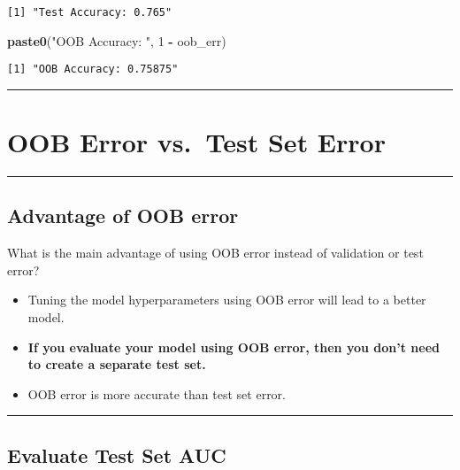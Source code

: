 \documentclass[
]{book}
\newenvironment{Shaded}{\begin{snugshade}}{\end{snugshade}}
\newcommand{\DecValTok}[1]{\textcolor[rgb]{0.00,0.00,0.81}{#1}}
\newcommand{\KeywordTok}[1]{\textcolor[rgb]{0.13,0.29,0.53}{\textbf{#1}}}
\newcommand{\NormalTok}[1]{#1}
\newcommand{\OperatorTok}[1]{\textcolor[rgb]{0.81,0.36,0.00}{\textbf{#1}}}
\newcommand{\StringTok}[1]{\textcolor[rgb]{0.31,0.60,0.02}{#1}}
\begin{document}
\begin{verbatim}
[1] "Test Accuracy: 0.765"
\end{verbatim}

\begin{Shaded}
\begin{Highlighting}[]
\KeywordTok{paste0}\NormalTok{(}\StringTok{"OOB Accuracy: "}\NormalTok{, }\DecValTok{1} \OperatorTok{-}\StringTok{ }\NormalTok{oob_err)}
\end{Highlighting}
\end{Shaded}

\begin{verbatim}
[1] "OOB Accuracy: 0.75875"
\end{verbatim}

\begin{center}\rule{0.5\linewidth}{0.5pt}\end{center}

\hypertarget{oob-error-vs.-test-set-error}{%
\section{OOB Error vs.~Test Set Error}\label{oob-error-vs.-test-set-error}}

\begin{center}\rule{0.5\linewidth}{0.5pt}\end{center}

\hypertarget{advantage-of-oob-error}{%
\subsection{Advantage of OOB error}\label{advantage-of-oob-error}}

What is the main advantage of using OOB error instead of validation or test error?

\begin{itemize}
\item
  Tuning the model hyperparameters using OOB error will lead to a better model.
\item
  \textbf{If you evaluate your model using OOB error, then you don't need to create a separate test set.}
\item
  OOB error is more accurate than test set error.
\end{itemize}

\begin{center}\rule{0.5\linewidth}{0.5pt}\end{center}

\hypertarget{evaluate-test-set-auc}{%
\subsection{Evaluate Test Set AUC}\label{evaluate-test-set-auc}}
\end{document}
